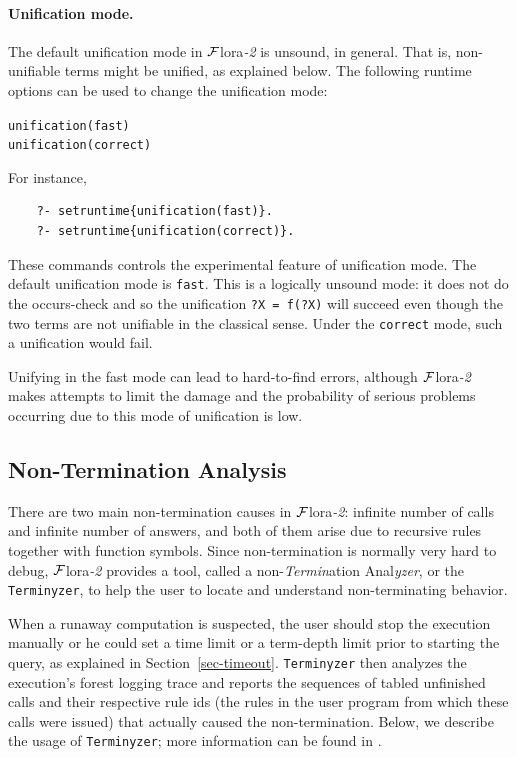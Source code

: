 \documentclass[11pt]{article}
\newcommand{\FLSYSTEM}{{\mbox{\sc ${\cal F}${lora}\rm\emph{-2}}}\xspace}
\begin{document}
\paragraph{Unification mode.} The default unification mode in \FLSYSTEM is
unsound, in general. That is, non-unifiable terms might be unified, as
explained below. The following runtime options can be used to change the
unification mode:
\begin{alltt}
    unification(fast)
    unification(correct)
\end{alltt}
For instance,
\begin{verbatim}
    ?- setruntime{unification(fast)}.
    ?- setruntime{unification(correct)}.
\end{verbatim}
These commands controls the experimental feature of unification mode.
The default unification mode is \texttt{fast}. This is a logically unsound
mode: it does not do the occurs-check and so the unification
\texttt{?X = f(?X)} will succeed even though the two terms are not
unifiable in the classical sense. Under the \texttt{correct} mode, such a
unification would fail.

Unifying in the fast mode can lead to hard-to-find errors, although \FLSYSTEM
makes attempts to limit the damage and the probability of serious problems
occurring due to this mode of unification is low.

\subsection{Non-Termination Analysis}\label{sec-terminyzer}


There are two main non-termination causes in \FLSYSTEM: infinite number of
calls and infinite number of answers, and both of them arise due to
recursive rules together with function symbols. 
Since non-termination is normally very hard to debug, \FLSYSTEM provides 
a tool, called a
non-\emph{Termin}ation Anal\emph{yzer}, or the
\texttt{Terminyzer}, to help the user to locate and understand
non-terminating behavior. 

When a runaway computation is suspected, the user should stop the execution
manually or he could set a 
time limit or a term-depth limit prior to starting the query, as explained
in Section~\ref{sec-timeout}.
\texttt{Terminyzer} then analyzes the execution's forest logging trace
and reports the sequences of tabled unfinished calls and their
respective rule ids (the rules in the user program from which these
calls were issued) that actually caused the non-termination.
Below, we describe the usage of \texttt{Terminyzer}; more
information can be found in \cite{terminyzer}.
\end{document}

